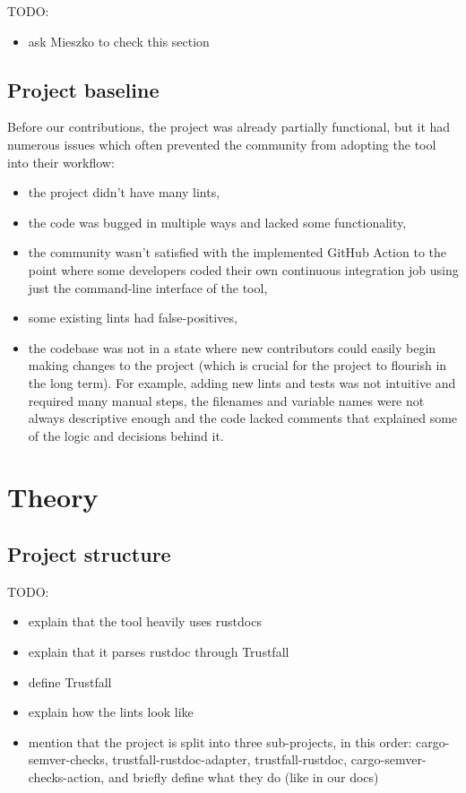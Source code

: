 \documentclass[licencjacka,en]{pracamgr}
\begin{document}
TODO:
\begin{itemize}
	\item ask Mieszko to check this section
\end{itemize}

\section{Project baseline}

Before our contributions, the project was already partially functional,
but it had numerous issues which often prevented the community from adopting the tool
into their workflow:
\begin{itemize}
	\item the project didn't have many lints,
	\item the code was bugged in multiple ways and lacked some functionality,
	\item the community wasn't satisfied with the implemented GitHub Action to the point where
		some developers coded their own continuous integration job using just the command-line interface of the tool,
	\item some existing lints had false-positives,
	\item the codebase was not in a state where new contributors could easily begin making changes
		to the project (which is crucial for the project to flourish in the long term).
		For example, adding new lints and tests was not intuitive and required many manual steps,
		the filenames and variable names were not always descriptive enough
		and the code lacked comments that explained some of the logic and decisions behind it.
\end{itemize}


\chapter{Theory}\label{r:chapter_theory}

\section{Project structure}\label{r:section_projectstructure}

TODO:
\begin{itemize}
	\item explain that the tool heavily uses rustdocs
	\item explain that it parses rustdoc through Trustfall
	\item define Trustfall
	\item explain how the lints look like
	\item mention that the project is split into three sub-projects,
		in this order: cargo-semver-checks, trustfall-rustdoc-adapter, trustfall-rustdoc,
		cargo-semver-checks-action,
		and briefly define what they do (like in our docs)
\end{itemize}
\end{document}
